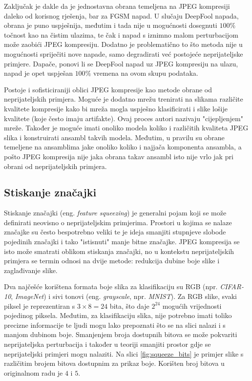 \documentclass[utf8, diplomski]{fer}
\begin{document}
Zaključak je dakle da je jednostavna obrana temeljena na JPEG kompresiji daleko od korisnog rješenja, bar za FGSM napad. U slučaju DeepFool napada, obrana je puno uspješnija, međutim i tada nije u mogućnosti dosegnuti $100\%$ točnost kao na čistim ulazima, te čak i napad s iznimno malom perturbacijom može zaobići JPEG kompresiju. Dodatno je problematično to što metoda nije u mogućnosti spriječiti nove napade, samo degradirati već postojeće neprijateljske primjere. Dapače, ponovi li se DeepFool napad uz JPEG kompresiju na ulazu, napad je opet uspješan $100\%$ vremena na ovom skupu podataka. 
\par
Postoje i sofisticiraniji oblici JPEG kompresije kao metode obrane\citep{jpeg2} od neprijateljskih primjera. Moguće je dodatno mrežu trenirati na slikama različite kvalitete kompresije kako bi mreža mogla uspješno klasificirati i slike lošije kvalitete (koje često imaju artifakte). Ovaj proces autori nazivaju "cijepljenjem" mreže. Također je moguće imati onoliko modela koliko i različitih kvaliteta JPEG slika i konstruirati ansambl takvih modela. Međutim, u pravilu su obrane temeljene na ansamblima jake onoliko koliko i najjača komponenta ansambla, a pošto JPEG kompresija nije jaka obrana takav ansambl isto nije vrlo jak pri obrani od neprijateljskih primjera.

\subsection{Stiskanje značajki}
Stiskanje značajki\citep{squeezing} (eng. \textit{feature squeezing}) je generalni pojam koji se može definirati neovisno o neprijateljskim primjerima. Prostori u kojima se nalaze značajke su često bespotrebno veliki te je ideja smanjiti stupnjeve slobode pojedinih značajki i tako "istisnuti" manje bitne značajke. JPEG kompresija\label{jpeg_comp} se isto može smatrati oblikom stiskanja značajki, no u kontekstu neprijateljskih primjera se termin odnosi na dvije metode: redukcija dubine boje slike i zaglađivanje slike. \par
Dva najčešće korištena formata boje slika za klasifikaciju su RGB (npr. \textit{CIFAR-10}, \textit{ImageNet}) i sivi tonovi (eng. \textit{grayscale}, npr. \textit{MNIST}). Za RGB slike, svaki piksel je reprezentiran s $3 \times 8 = 24$ bita, što daje $2^{24}$ mogućih vrijednosti pojedinog piksela. Međutim, za klasifikaciju slika, nije potrebno imati toliko precizne informacije te ljudi mogu lako prepoznati što se na slici nalazi i s manjom dubinom boje. Smanjenjem broja dostupnih bitova se može pokvariti neprijateljska perturbacija i također u teoriji smanjiti prostor gdje se neprijateljski primjeri mogu nalaziti. Na slici \ref{fig:squeeze_bits} je primjer slike s različitim brojem bitova dostupnim za prikaz boje. Korišten broj bitova u originalnom radu je $4$ i $5$.
\end{document}
